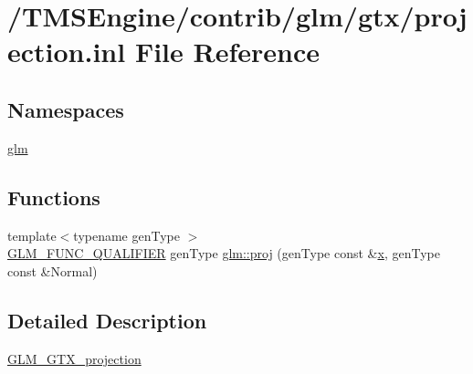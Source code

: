 \hypertarget{projection_8inl}{}\section{/\+T\+M\+S\+Engine/contrib/glm/gtx/projection.inl File Reference}
\label{projection_8inl}
\subsection*{Namespaces}
\begin{DoxyCompactItemize}
\item 
 \hyperlink{namespaceglm}{glm}
\end{DoxyCompactItemize}
\subsection*{Functions}
\begin{DoxyCompactItemize}
\item 
{\footnotesize template$<$typename gen\+Type $>$ }\\\hyperlink{setup_8hpp_a33fdea6f91c5f834105f7415e2a64407}{G\+L\+M\+\_\+\+F\+U\+N\+C\+\_\+\+Q\+U\+A\+L\+I\+F\+I\+ER} gen\+Type \hyperlink{group__gtx__projection_ga58384b7170801dd513de46f87c7fb00e}{glm\+::proj} (gen\+Type const \&\hyperlink{_s_d_l__opengl_8h_ad0e63d0edcdbd3d79554076bf309fd47}{x}, gen\+Type const \&Normal)
\end{DoxyCompactItemize}


\subsection{Detailed Description}
\hyperlink{group__gtx__projection}{G\+L\+M\+\_\+\+G\+T\+X\+\_\+projection} 